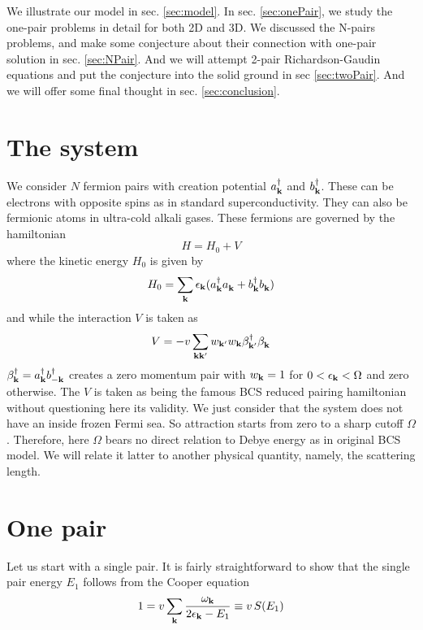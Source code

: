 \documentclass[aps,prb,showpacs,reprint]{revtex4-1}
\begin{document}
We illustrate our model in sec. \ref{sec:model}.  In sec. \ref{sec:onePair}, we study the one-pair problems in detail for both 2D and 3D.  We discussed the N-pairs problems, and make some conjecture about their connection with one-pair solution  in sec. \ref{sec:NPair}.  And we will attempt 2-pair Richardson-Gaudin equations and put the conjecture into the solid ground in sec \ref{sec:twoPair}.  And we will offer some final thought in sec. \ref{sec:conclusion}.
\section{The system\label{sec:model}}
We consider $N$ fermion pairs with creation potential $a_{\mathbf{k}}^\dagger$ and $b_{\mathbf{k}}^\dagger$. These can be electrons with opposite spins as in standard superconductivity.  They can also be fermionic atoms in ultra-cold alkali gases.  These fermions are  governed by the hamiltonian
\begin{equation}
H=H_{0}+V
\end{equation}
where  the kinetic energy $H_0$ is given by
\begin{equation}
H_0=\sum_{\mathbf{k}}\epsilon_{\mathbf{k}}(a^\dagger_{\mathbf{k}}{}a^{}_{\mathbf{k}}+b^\dagger_{\mathbf{k}}{}b^{}_{\mathbf{k}})
\label{eq:}
\end{equation}
and while the interaction $V$ is taken as 
\begin{equation}
V=-v\sum_{\mathbf{k}\mathbf{k}'}w_{\mathbf{k}'}w_{\mathbf{k}}\beta^\dagger_{\mathbf{k}'}{}\beta^{}_{\mathbf{k}}
\label{eq:VBcs}
\end{equation}
 $\beta^\dagger_{\mathbf{k}}=a^\dagger_{\mathbf{k}}b^\dagger_{-\mathbf{k}}$ creates a zero momentum pair with $w_{\mathbf{k}}=1$ for $0<\epsilon_{\mathbf{k}}<\Omega$ and zero otherwise.  The $V$ is taken as being the famous BCS reduced pairing hamiltonian without questioning here its validity.  We just consider that the system does not have an inside frozen Fermi sea. So attraction starts from zero to a sharp cutoff $\Omega$.  Therefore, here $\Omega$ bears no direct relation to Debye energy as in original BCS model. We will relate it latter to another physical quantity, namely, the scattering length. 
\section{One pair\label{sec:onePair}}
Let us start with a single pair. It is fairly straightforward to show that the single pair energy $E_1$ follows from the Cooper equation
\begin{equation}
1=v\sum_{\mathbf{k}}\frac{\omega_{\mathbf{k}}}{2\epsilon_{\mathbf{k}}-E_1}\equiv{}v\,S(E_1)
\label{eq:onePair}
\end{equation}
\end{document}
